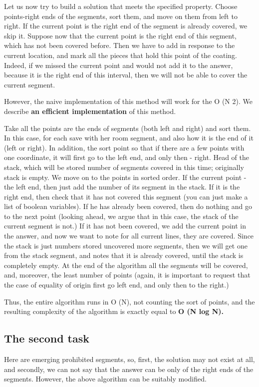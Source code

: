 Let us now try to build a solution that meets the specified property. Choose points-right ends of the segments, sort them, and move on them from left to right. If the current point is the right end of the segment is already covered, we skip it. Suppose now that the current point is the right end of this segment, which has not been covered before. Then we have to add in response to the current location, and mark all the pieces that hold this point of the coating. Indeed, if we missed the current point and would not add it to the answer, because it is the right end of this interval, then we will not be able to cover the current segment.

However, the naive implementation of this method will work for the O (N 2). We describe \textbf{an efficient implementation} of this method.

Take all the points are the ends of segments (both left and right) and sort them. In this case, for each save with her room segment, and also how it is the end of it (left or right). In addition, the sort point so that if there are a few points with one coordinate, it will first go to the left end, and only then - right. Head of the stack, which will be stored number of segments covered in this time; originally stack is empty. We move on to the points in sorted order. If the current point - the left end, then just add the number of its segment in the stack. If it is the right end, then check that it has not covered this segment (you can just make a list of boolean variables). If he has already been covered, then do nothing and go to the next point (looking ahead, we argue that in this case, the stack of the current segment is not.) If it has not been covered, we add the current point in the answer, and now we want to note for all current lines, they are covered. Since the stack is just numbers stored uncovered more segments, then we will get one from the stack segment, and notes that it is already covered, until the stack is completely empty. At the end of the algorithm all the segments will be covered, and, moreover, the least number of points (again, it is important to request that the case of equality of origin first go left end, and only then to the right.)

Thus, the entire algorithm runs in O (N), not counting the sort of points, and the resulting complexity of the algorithm is exactly equal to \textbf{O (N log N).}

\subsection{ The second task }
Here are emerging prohibited segments, so, first, the solution may not exist at all, and secondly, we can not say that the answer can be only of the right ends of the segments. However, the above algorithm can be suitably modified.

